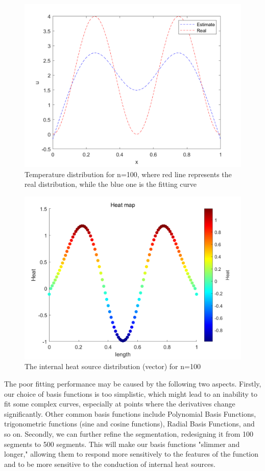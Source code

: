 \documentclass{article}
\begin{document}
    
    \begin{figure}[H]
        \centering %
        \includegraphics[width=12cm]{pic/n=100.png} %
        \caption{Temperature distribution for n=100, where red line represents the real distribution, while the blue one is the fitting curve} %
        \label{tem_100}
    \end{figure}
    \begin{figure}[H]
        \centering %
        \includegraphics[width=12cm]{pic/f_n=100.png} %
        \caption{The internal heat source distribution (vector) for n=100} %
        \label{heat_100}
    \end{figure}
    The poor fitting performance may be caused by the following two aspects. Firstly, our choice of basis functions is too simplistic, which might lead to an inability to fit some complex curves, especially at points where the derivatives change significantly. Other common basis functions include Polynomial Basis Functions, trigonometric functions (sine and cosine functions), Radial Basis Functions, and so on. Secondly, we can further refine the segmentation, redesigning it from 100 segments to 500 segments. This will make our basis functions "slimmer and longer," allowing them to respond more sensitively to the features of the function and to be more sensitive to the conduction of internal heat sources.
    
\end{document}
